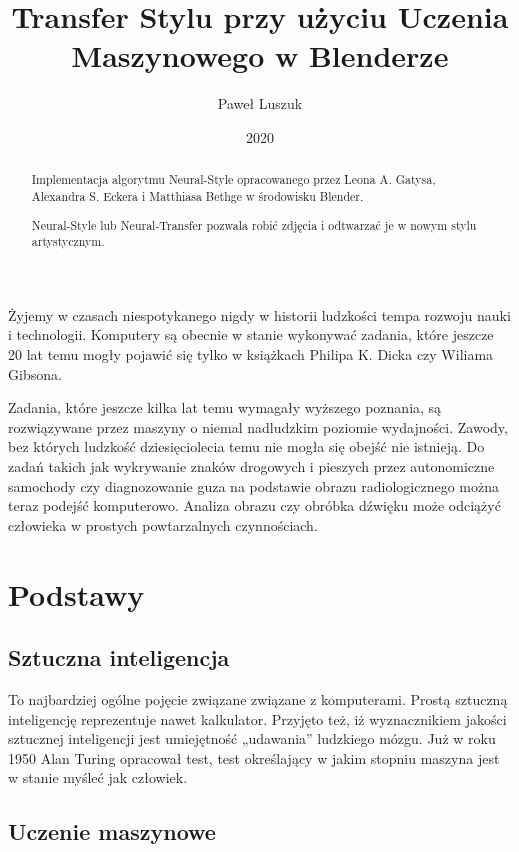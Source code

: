 \documentclass[brudnopis]{xmgr}
\author   {Paweł Luszuk}
\title    {Transfer Stylu przy użyciu Uczenia Maszynowego w Blenderze}
\date     {2020}
\begin{document}
\begin{abstract}
Implementacja algorytmu Neural-Style opracowanego przez Leona A. Gatysa, Alexandra S. Eckera i Matthiasa Bethge w środowisku Blender.

Neural-Style lub Neural-Transfer pozwala robić zdjęcia i odtwarzać je w nowym stylu artystycznym. 
\end{abstract}


\maketitle

\introduction

Żyjemy w czasach niespotykanego nigdy w historii ludzkości tempa rozwoju nauki i technologii. Komputery są obecnie w stanie wykonywać zadania, które jeszcze 20 lat temu mogły pojawić się tylko w książkach Philipa K. Dicka czy Wiliama Gibsona.

Zadania, które jeszcze kilka lat temu wymagały wyższego poznania, są rozwiązywane przez maszyny o niemal nadludzkim poziomie wydajności. Zawody, bez których ludzkość dziesięciolecia temu nie mogła się obejść nie istnieją. Do zadań takich jak wykrywanie znaków drogowych i pieszych przez autonomiczne samochody czy diagnozowanie guza na podstawie obrazu radiologicznego można teraz podejść komputerowo. Analiza obrazu czy obróbka dźwięku może odciążyć człowieka w prostych powtarzalnych czynnościach.


\chapter{Podstawy\label{s:dtd}}

\section{Sztuczna inteligencja}

To najbardziej ogólne pojęcie związane związane z komputerami. Prostą sztuczną inteligencję reprezentuje nawet kalkulator. Przyjęto też, iż wyznacznikiem jakości sztucznej inteligencji jest umiejętność „udawania” ludzkiego mózgu. Już w roku 1950 Alan Turing opracował test, test określający w jakim stopniu maszyna jest w stanie myśleć jak człowiek.

\section{Uczenie maszynowe}
\end{document}
